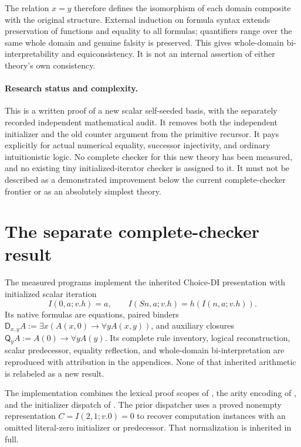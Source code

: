 \documentclass[11pt,letterpaper]{article}
\theoremstyle{definition}\newtheorem{definition}[theorem]{Definition}
\theoremstyle{remark}\newtheorem{remark}[theorem]{Remark}
\newcommand{\D}{\mathsf D}
\newcommand{\Q}{\mathsf Q}
\begin{document}
The relation $x=y$ therefore defines the isomorphism of each domain
composite with the original structure. External induction on formula
syntax extends preservation of functions and equality to all formulas;
quantifiers range over the same whole domain and genuine falsity is
preserved. This gives whole-domain bi-interpretability and
equiconsistency. It is not an internal assertion of either theory's
own consistency.

\paragraph{Research status and complexity.}
This is a written proof of a new scalar self-seeded basis, with the
separately recorded independent mathematical audit. It removes both
the independent initializer and the old counter argument from the
primitive recursor. It pays explicitly for actual numerical equality,
successor injectivity, and ordinary intuitionistic
logic. No complete checker for this new theory has been measured,
and no existing tiny initialized-iterator checker is assigned to it.
It must not be described as a demonstrated improvement below the
current complete-checker frontier or as an absolutely simplest theory.



\section{The separate complete-checker result}
\label{sec:local-kernels}
The measured programs implement the inherited Choice-DI presentation
with initialized scalar iteration
\[
I(0,a;v.h)=a,\qquad I(Sn,a;v.h)=h(I(n,a;v.h)).
\]
Its native formulas are equations, paired binders
$\D_{x,y}A:=\exists x(A(x,0)\to\forall y A(x,y))$, and auxiliary
closures $\Q_yA:=A(0)\to\forall y A(y)$. Its complete rule inventory,
logical reconstruction, scalar predecessor, equality reflection, and
whole-domain bi-interpretation are reproduced with attribution in the
appendices. None of that inherited arithmetic is relabeled as a new result.

The implementation combines the lexical proof scopes of
\cite{scopes}, the arity encoding of \cite{arity}, and the initializer
dispatch of \cite{certified}. The prior dispatcher uses a proved
nonempty representation $C=I(2,1;v.0)=0$ to recover computation instances
with an omitted literal-zero initializer or predecessor. That
normalization is inherited in full.
\end{document}
